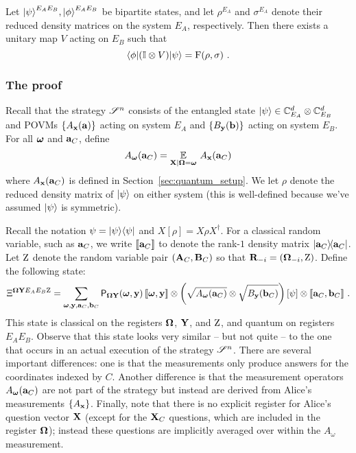 \begin{theorem}
\label{thm:uhlmann}
	Let ${|\psi\rangle}^{E_A E_B},{|\phi\rangle}^{E_A E_B}$ be bipartite states, and let $\rho^{E_A}$ and $\sigma^{E_A}$ denote their reduced density matrices on the system $E_A$, respectively. Then there exists a unitary map $V$ acting on $E_B$ such that
	\[
		{\langle\phi|} (\mathbb{I} \otimes V) {|\psi\rangle} = \mathrm{F}(\rho,\sigma)~.
	\]
\end{theorem}



\subsubsection{The proof}

Recall that the strategy $\mathscr{S}^n$ consists of the entangled state ${|\psi\rangle} \in \mathbb{C}^d_{E_A} \otimes \mathbb{C}^d_{E_B}$ and POVMs $\{A_{\mathbf{x}}(\mathbf{a}) \}$ acting on system $E_A$ and $\{B_{\mathbf{y}}(\mathbf{b}) \}$ acting on system $E_B$. For all ${\boldsymbol{\omega}}$ and $\mathbf{a}_C$, define
\[
	A_{\boldsymbol{\omega}}(\mathbf{a}_C) = \operatorname*{\mathbb{E}}_{\mathbf{X} | {\boldsymbol{\Omega}} = {\boldsymbol{\omega}}} \, A_{\mathbf{x}}(\mathbf{a}_C)
\]
where $A_{\mathbf{x}}(\mathbf{a}_C)$ is defined in Section~\ref{sec:quantum_setup}. 
We let $\rho$ denote the reduced density matrix of ${|\psi\rangle}$ on either system (this is well-defined because we've assumed ${|\psi\rangle}$ is symmetric). 

Recall the notation $\psi = {|\psi\rangle}{\langle\psi|}$ and $X[\rho]=X\rho X^\dagger$. For a classical random variable, such as $\mathbf{a}_C$, we write $\llbracket \mathbf{a}_C \rrbracket$ to denote the rank-$1$ density matrix $|\mathbf{a}_C\rangle\! \langle \mathbf{a}_C|$. Let $\mathrm{Z}$ denote the random variable pair $(\mathbf{A}_C, \mathbf{B}_C)$ so that $\mathbf{R}_{-i} = ({\boldsymbol{\Omega}}_{-i},\mathrm{Z})$. Define the following state:
\[
\Xi^{{\boldsymbol{\Omega}} \mathbf{Y} E_AE_B\mathrm{Z}} = \sum_{{\boldsymbol{\omega}}, \mathbf{y}, \mathbf{a}_C, \mathbf{b}_C} \mathsf{P}_{{\boldsymbol{\Omega}} \mathbf{Y}} ({\boldsymbol{\omega}}, \mathbf{y}) \, \llbracket {\boldsymbol{\omega}}, \mathbf{y} \rrbracket   \otimes \left (\sqrt{A_{{\boldsymbol{\omega}}}(\mathbf{a}_C)} \otimes \sqrt{B_{\mathbf{y}}(\mathbf{b}_C)} \right ) \left [\psi \right ] \otimes \llbracket \mathbf{a}_C, \mathbf{b}_C \rrbracket~.
\]
This state is classical on the registers ${\boldsymbol{\Omega}}$, $\mathbf{Y}$, and $\mathrm{Z}$, and quantum on registers $E_A E_B$. Observe that this state looks very similar -- but not quite -- to the one that occurs in an actual execution of the strategy $\mathscr{S}^n$. There are several important differences: one is that the measurements only produce answers for the coordinates indexed by $C$. Another difference is that the measurement operators $A_{\boldsymbol{\omega}}(\mathbf{a}_C)$ are not part of the strategy but instead are derived from Alice's measurements $\{A_{\mathbf{x}}\}$. Finally, note that there is no explicit register for Alice's question vector $\mathbf{X}$ (except for the $\mathbf{X}_C$ questions, which are included in the register ${\boldsymbol{\Omega}}$); instead these questions are implicitly averaged over within the $A_\omega$ measurement. 

